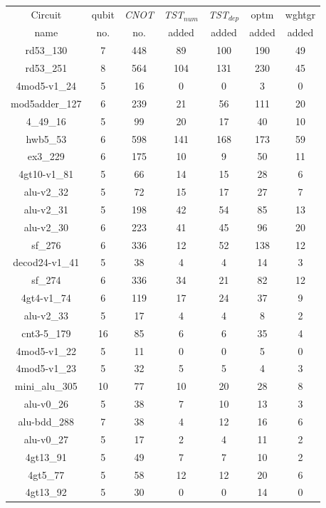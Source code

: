 \documentclass[runningheads]{llncs}
\begin{document}
	\begin{table}[H]
		\begin{center}  
		\begin{tabular}{|c|c|c|c|c|c|c|}
		\hline
		Circuit &  qubit  & \textit{CNOT} &\textit{TST$_{num}$}& \textit{TST$_{dep}$}  & optm 	 & wghtgr 	\\
		 name	&   no. 	&	no. & added&  added &  added 	&  added\\
		\hline
		rd53\_130 & 7 & 448 & 89 & 100 & 190 & 49 \\ 
rd53\_251 & 8 & 564 & 104 & 131 & 230 & 45 \\ 
4mod5-v1\_24 & 5 & 16 & 0 & 0 & 3 & 0 \\ 
mod5adder\_127 & 6 & 239 & 21 & 56 & 111 & 20 \\ 
4\_49\_16 & 5 & 99 & 20 & 17 & 40 & 10 \\ 
hwb5\_53 & 6 & 598 & 141 & 168 & 173 & 59 \\ 
ex3\_229 & 6 & 175 & 10 & 9 & 50 & 11 \\ 
4gt10-v1\_81 & 5 & 66 & 14 & 15 & 28 & 6 \\ 
alu-v2\_32 & 5 & 72 & 15 & 17 & 27 & 7 \\ 
alu-v2\_31 & 5 & 198 & 42 & 54 & 85 & 13 \\ 
alu-v2\_30 & 6 & 223 & 41 & 45 & 96 & 20 \\ 
sf\_276 & 6 & 336 & 12 & 52 & 138 & 12 \\ 
decod24-v1\_41 & 5 & 38 & 4 & 4 & 14 & 3 \\ 
sf\_274 & 6 & 336 & 34 & 21 & 82 & 12 \\ 
4gt4-v1\_74 & 6 & 119 & 17 & 24 & 37 & 9 \\ 
alu-v2\_33 & 5 & 17 & 4 & 4 & 8 & 2 \\ 
cnt3-5\_179 & 16 & 85 & 6 & 6 & 35 & 4 \\ 
4mod5-v1\_22 & 5 & 11 & 0 & 0 & 5 & 0 \\ 
4mod5-v1\_23 & 5 & 32 & 5 & 5 & 4 & 3 \\ 
mini\_alu\_305 & 10 & 77 & 10 & 20 & 28 & 8 \\ 
alu-v0\_26 & 5 & 38 & 7 & 10 & 13 & 3 \\ 
alu-bdd\_288 & 7 & 38 & 4 & 12 & 16 & 6 \\ 
alu-v0\_27 & 5 & 17 & 2 & 4 & 11 & 2 \\ 
4gt13\_91 & 5 & 49 & 7 & 7 & 10 & 2 \\ 
4gt5\_77 & 5 & 58 & 12 & 12 & 20 & 6 \\ 
4gt13\_92 & 5 & 30 & 0 & 0 & 14 & 0 \\ 

\end{tabular}
\end{center}
\end{table}
\end{document}
